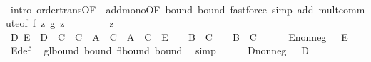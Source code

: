 \begin{isabellebody}
\ \ \ \ \isamarkupfalse%
\ {\isacharparenleft}{\kern0pt}intro\ order{\isacharunderscore}{\kern0pt}trans{\isacharbrackleft}{\kern0pt}OF\ {\isacharunderscore}{\kern0pt}\ add{\isacharunderscore}{\kern0pt}mono{\isacharbrackleft}{\kern0pt}OF\ bound{\isacharparenleft}{\kern0pt}{}{\isacharparenright}{\kern0pt}\ bound{\isacharprime}{\kern0pt}{\isacharparenleft}{\kern0pt}{}{\isacharparenright}{\kern0pt}{\isacharbrackright}{\kern0pt}{\isacharbrackright}{\kern0pt}{\isacharparenright}{\kern0pt}\ {\isacharparenleft}{\kern0pt}fastforce\ simp\ add{\isacharcolon}{\kern0pt}\ mult{\isachardot}{\kern0pt}commute{\isacharbrackleft}{\kern0pt}of\ {\isachardoublequoteopen}f\ z{\isachardoublequoteclose}\ {\isachardoublequoteopen}g\ z{\isachardoublequoteclose}{\isacharbrackright}{\kern0pt}{\isacharparenright}{\kern0pt}\isanewline
\isanewline
\ \ \isacommand{{\isacharbraceleft}{\kern0pt}}\isamarkupfalse%
\isanewline
\ \ \ \ \isamarkupfalse%
\ z\isanewline
\ \ \ \ \isamarkupfalse%
\ D\ E\ \ {\isachardoublequoteopen}D\ {\isacharequal}{\kern0pt}\ {\isacharparenleft}{\kern0pt}C\ {\isacharplus}{\kern0pt}\ C{\isacharprime}{\kern0pt}\ {\isacharplus}{\kern0pt}\ A{\isacharprime}{\kern0pt}\ {\isacharasterisk}{\kern0pt}\ C\ {\isacharplus}{\kern0pt}\ A\ {\isacharasterisk}{\kern0pt}\ C{\isacharprime}{\kern0pt}{\isacharparenright}{\kern0pt}{\isachardoublequoteclose}\ \ {\isachardoublequoteopen}E\ {\isacharequal}{\kern0pt}\ {\isacharparenleft}{\kern0pt}{}\ {\isacharplus}{\kern0pt}\ B{\isacharprime}{\kern0pt}{\isacharparenright}{\kern0pt}\ {\isacharasterisk}{\kern0pt}\ C\ {\isacharplus}{\kern0pt}\ {\isacharparenleft}{\kern0pt}{}\ {\isacharplus}{\kern0pt}\ B{\isacharparenright}{\kern0pt}\ {\isacharasterisk}{\kern0pt}\ C{\isacharprime}{\kern0pt}{\isachardoublequoteclose}\isanewline
\ \ \ \ \isamarkupfalse%
\ E{\isacharunderscore}{\kern0pt}nonneg{\isacharcolon}{\kern0pt}\ {\isachardoublequoteopen}{}\ {\isasymle}\ E{\isachardoublequoteclose}\ \isamarkupfalse%
\ E{\isacharunderscore}{\kern0pt}def\ \isamarkupfalse%
\ g{\isacharunderscore}{\kern0pt}lbound\ bound\ f{\isacharunderscore}{\kern0pt}lbound\ bound{\isacharprime}{\kern0pt}\ \isamarkupfalse%
\ simp\isanewline
\ \ \ \ \isamarkupfalse%
\ D{\isacharunderscore}{\kern0pt}nonneg{\isacharcolon}{\kern0pt}\ {\isachardoublequoteopen}{}\ {\isasymle}\ D{\isachardoublequoteclose}\ \isamarkupfalse%

\end{isabellebody}
